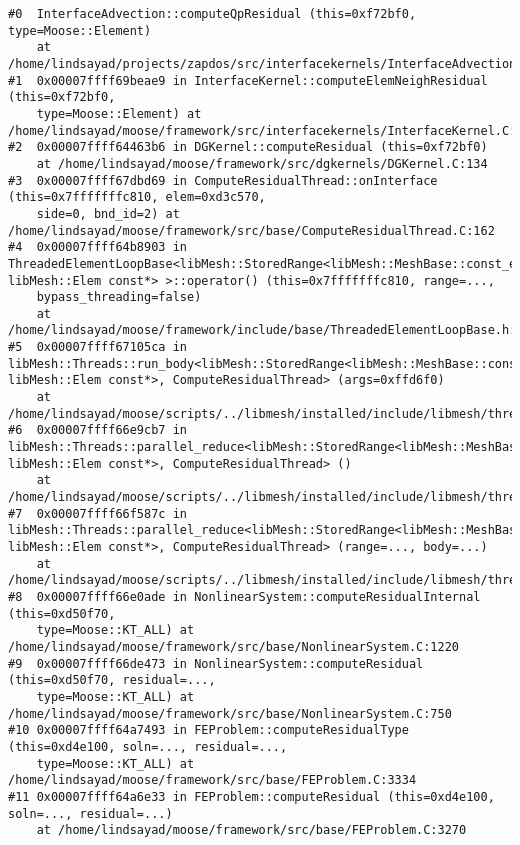\begin{lstlisting}[caption = Stack trace showing the architecture for how InterfaceKernel residuals get called, label = code:stack]
#0  InterfaceAdvection::computeQpResidual (this=0xf72bf0, type=Moose::Element)
    at /home/lindsayad/projects/zapdos/src/interfacekernels/InterfaceAdvection.C:56
#1  0x00007ffff69beae9 in InterfaceKernel::computeElemNeighResidual (this=0xf72bf0,
    type=Moose::Element) at /home/lindsayad/moose/framework/src/interfacekernels/InterfaceKernel.C:57
#2  0x00007ffff64463b6 in DGKernel::computeResidual (this=0xf72bf0)
    at /home/lindsayad/moose/framework/src/dgkernels/DGKernel.C:134
#3  0x00007ffff67dbd69 in ComputeResidualThread::onInterface (this=0x7fffffffc810, elem=0xd3c570,
    side=0, bnd_id=2) at /home/lindsayad/moose/framework/src/base/ComputeResidualThread.C:162
#4  0x00007ffff64b8903 in ThreadedElementLoopBase<libMesh::StoredRange<libMesh::MeshBase::const_element_iterator, libMesh::Elem const*> >::operator() (this=0x7fffffffc810, range=...,
    bypass_threading=false)
    at /home/lindsayad/moose/framework/include/base/ThreadedElementLoopBase.h:180
#5  0x00007ffff67105ca in libMesh::Threads::run_body<libMesh::StoredRange<libMesh::MeshBase::const_element_iterator, libMesh::Elem const*>, ComputeResidualThread> (args=0xffd6f0)
    at /home/lindsayad/moose/scripts/../libmesh/installed/include/libmesh/threads.h:460
#6  0x00007ffff66e9cb7 in libMesh::Threads::parallel_reduce<libMesh::StoredRange<libMesh::MeshBase::const_element_iterator, libMesh::Elem const*>, ComputeResidualThread> ()
    at /home/lindsayad/moose/scripts/../libmesh/installed/include/libmesh/threads.h:658
#7  0x00007ffff66f587c in libMesh::Threads::parallel_reduce<libMesh::StoredRange<libMesh::MeshBase::const_element_iterator, libMesh::Elem const*>, ComputeResidualThread> (range=..., body=...)
    at /home/lindsayad/moose/scripts/../libmesh/installed/include/libmesh/threads.h:647
#8  0x00007ffff66e0ade in NonlinearSystem::computeResidualInternal (this=0xd50f70,
    type=Moose::KT_ALL) at /home/lindsayad/moose/framework/src/base/NonlinearSystem.C:1220
#9  0x00007ffff66de473 in NonlinearSystem::computeResidual (this=0xd50f70, residual=...,
    type=Moose::KT_ALL) at /home/lindsayad/moose/framework/src/base/NonlinearSystem.C:750
#10 0x00007ffff64a7493 in FEProblem::computeResidualType (this=0xd4e100, soln=..., residual=...,
    type=Moose::KT_ALL) at /home/lindsayad/moose/framework/src/base/FEProblem.C:3334
#11 0x00007ffff64a6e33 in FEProblem::computeResidual (this=0xd4e100, soln=..., residual=...)
    at /home/lindsayad/moose/framework/src/base/FEProblem.C:3270

\end{lstlisting}
